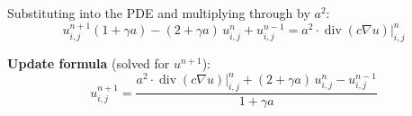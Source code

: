 \documentclass{report}
\begin{document}
Substituting into the PDE and multiplying through by $a^2$:
\begin{equation}
	u_{i,j}^{n+1}(1 + \gamma a) - (2 + \gamma a)\,u_{i,j}^n + u_{i,j}^{n-1}
	= a^2 \cdot \operatorname{div}(c\nabla u)\big|_{i,j}^n
\end{equation}

\textbf{Update formula} (solved for $u^{n+1}$):
\begin{equation}
	\boxed{
	u_{i,j}^{n+1} = \frac{a^2\cdot\operatorname{div}(c\nabla u)\big|_{i,j}^n
	+ (2 + \gamma a)\,u_{i,j}^n - u_{i,j}^{n-1}}{1 + \gamma a}
	}
\end{equation}


\end{document}
